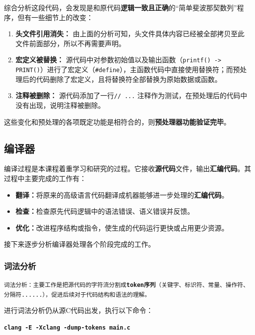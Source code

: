 \documentclass[UTF8,a4paper,10pt]{ctexart}
\begin{document}
综合分析这段代码，会发现是和原代码\textbf{逻辑一致且正确}的“简单斐波那契数列”程序，但有一些细节上的改变：
\begin{enumerate}
    \item \textbf{头文件引用消失：} 由上面的分析可知，头文件具体内容已经被全部拷贝至此文件前面部分，所以不再需要声明。
    \item \textbf{宏定义被替换：} 源代码中对参数初始值以及输出函数（\texttt{printf() -> PRINT()}）进行了宏定义（\texttt{\#define}），主函数代码中直接使用替换符；而预处理后的代码删除了宏定义，且将替换符全部替换为原始数据或函数。
    \item \textbf{注释被删除：} 源代码添加了一行\texttt{// ...} 注释作为测试，在预处理后的代码中没有出现，说明注释被删除。
\end{enumerate}

这些变化和预处理的各项既定功能是相符合的，则\textbf{预处理器功能验证完毕}。

\vspace{1em}

\subsection{编译器}
编译过程是本课程着重学习和研究的过程。它接收\textbf{源代码}文件，输出\textbf{汇编代码}。其过程中主要完成的工作有：
\begin{itemize}
    \item \textbf{翻译：}将原来的高级语言代码翻译成机器能够进一步处理的\textbf{汇编代码}。
    \item \textbf{检查：}检查原先代码逻辑中的语法错误、语义错误并反馈。
    \item \textbf{优化：}改进程序结构或指令，使生成的代码运行更快或占用更少资源。
\end{itemize}

接下来逐步分析编译器处理各个阶段完成的工作。

\subsubsection{词法分析}
\texttt{\large{词法分析：主要工作是把源代码的字符流分割成\textbf{token序列}（关键字、标识符、常量、操作符、分隔符......），促进后续对于代码结构和语法的理解。}}

\vspace{1em}


进行词法分析仍从源C代码出发，执行以下命令：

\begin{center}
    \textcolor{deepblue}{\textbf{\texttt{\large{clang -E -Xclang -dump-tokens main.c}}}}
\end{center}
\end{document}
